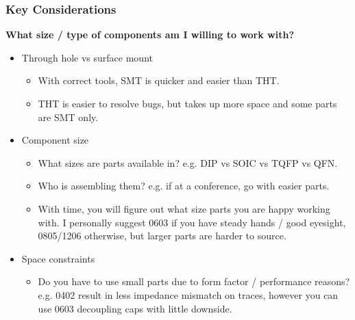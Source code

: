 \documentclass[t]{beamer}
\begin{document}

\begin{frame}
\frametitle{Key Considerations}
\large{\textbf{What size / type of components am I willing to work with?}}
\vspace{1mm}
\begin{itemize}
	\item Through hole vs surface mount
	\begin{itemize}
		\item With correct tools, SMT is quicker and easier than THT. 
		\item THT is easier to resolve bugs, but takes up more space and some parts are SMT only. 
	\end{itemize} 
	\item Component size
	\begin{itemize}
		\item What sizes are parts available in? e.g. DIP vs SOIC vs TQFP vs QFN.
		\item Who is assembling them? e.g. if at a conference, go with easier parts. 
		\item With time, you will figure out what size parts you are happy working with. I personally suggest 0603 if you have steady hands / good eyesight, 0805/1206 otherwise, but larger parts are harder to source. 
	\end{itemize}
	\item Space constraints
	\begin{itemize}
		\item Do you have to use small parts due to form factor / performance reasons? e.g. 0402 result in less impedance mismatch on traces, however you can use 0603 decoupling caps with little downside.   
	\end{itemize}
\end{itemize}
\end{frame}

\end{document}
